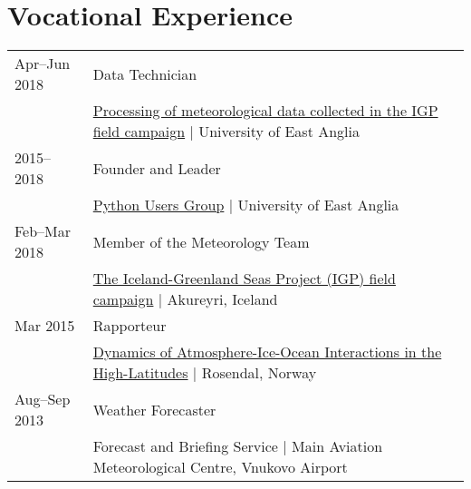 \documentclass[a4paper, 11pt]{article}
\begin{document}
\section{Vocational Experience}
\begin{tabularx}{\linewidth}{@{}l X@{}}
Apr--Jun 2018 & Data Technician \\ & \href{https://github.com/IGPResearch}{Processing of meteorological data collected in the IGP field campaign} | University of East Anglia \\
2015--2018 & Founder and Leader \\ & \href{https://ueapy.github.io/}{Python Users Group} | University of East Anglia \\
Feb--Mar 2018 & Member of the Meteorology Team \\ & \href{https://twitter.com/igpresearch}{The Iceland-Greenland Seas Project (IGP) field campaign} | Akureyri, Iceland \\
Mar 2015 & Rapporteur \\ & \href{https://highlatdynamics.w.uib.no}{Dynamics of Atmosphere-Ice-Ocean Interactions in the High-Latitudes} | Rosendal, Norway \\
Aug--Sep 2013 & Weather Forecaster \\ & Forecast and Briefing Service | Main Aviation Meteorological Centre, Vnukovo Airport \\
\end{tabularx}
\end{document}
